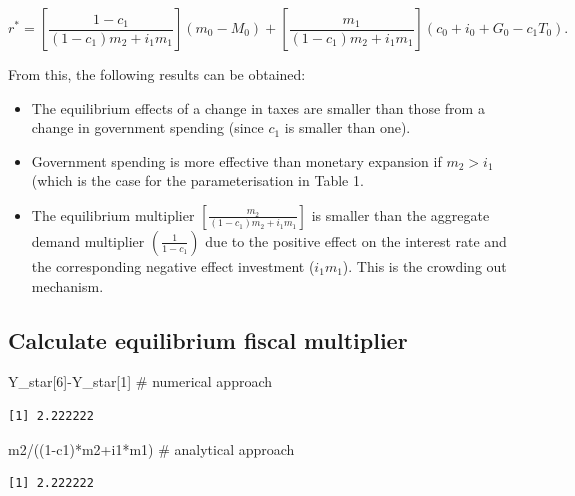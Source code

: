 \documentclass[
  letterpaper,
  DIV=11,
  numbers=noendperiod]{scrreprt}
\newenvironment{Shaded}{\begin{snugshade}}{\end{snugshade}}
\newcommand{\CommentTok}[1]{\textcolor[rgb]{0.37,0.37,0.37}{#1}}
\newcommand{\DecValTok}[1]{\textcolor[rgb]{0.68,0.00,0.00}{#1}}
\newcommand{\NormalTok}[1]{\textcolor[rgb]{0.00,0.23,0.31}{#1}}
\newcommand{\SpecialCharTok}[1]{\textcolor[rgb]{0.37,0.37,0.37}{#1}}
\begin{document}
\[
r^*= \left[\frac{1-c_1}{(1-c_1)m_2+i_1m_1}\right](m_0-M_0)+\left[\frac{m_1}{(1-c_1)m_2+i_1m_1}\right](c_0+i_0+G_0-c_1T_0).
\]

From this, the following results can be obtained:

\begin{itemize}
\item
  The equilibrium effects of a change in taxes are smaller than those
  from a change in government spending (since \(c_1\) is smaller than
  one).
\item
  Government spending is more effective than monetary expansion if
  \(m_2 > i_1\) (which is the case for the parameterisation in Table 1.
\item
  The equilibrium multiplier
  \(\left[\frac{m_2}{(1-c_1)m_2+i_1m_1}\right]\) is smaller than the
  aggregate demand multiplier \(\left(\frac{1}{1-c_1}\right)\) due to
  the positive effect on the interest rate and the corresponding
  negative effect investment (\(i_1m_1\)). This is the crowding out
  mechanism.
\end{itemize}

\subsection{Calculate equilibrium fiscal
multiplier}\label{calculate-equilibrium-fiscal-multiplier}

\begin{Shaded}
\begin{Highlighting}[]
\NormalTok{Y\_star[}\DecValTok{6}\NormalTok{]}\SpecialCharTok{{-}}\NormalTok{Y\_star[}\DecValTok{1}\NormalTok{] }\CommentTok{\# numerical approach}
\end{Highlighting}
\end{Shaded}

\begin{verbatim}
[1] 2.222222
\end{verbatim}

\begin{Shaded}
\begin{Highlighting}[]
\NormalTok{m2}\SpecialCharTok{/}\NormalTok{((}\DecValTok{1}\SpecialCharTok{{-}}\NormalTok{c1)}\SpecialCharTok{*}\NormalTok{m2}\SpecialCharTok{+}\NormalTok{i1}\SpecialCharTok{*}\NormalTok{m1) }\CommentTok{\# analytical approach}
\end{Highlighting}
\end{Shaded}

\begin{verbatim}
[1] 2.222222
\end{verbatim}
\end{document}
